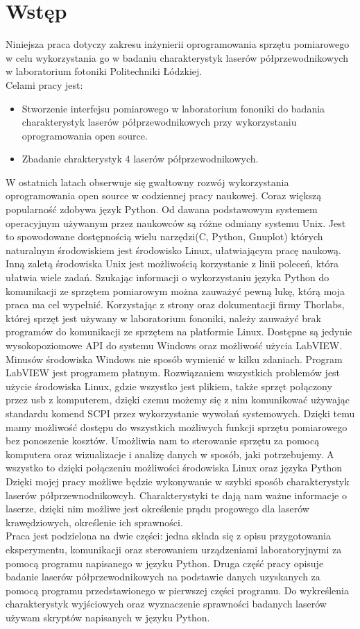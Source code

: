 \chapter{Wstęp} \label{rozdz.wstep}
Niniejsza praca dotyczy zakresu inżynierii oprogramowania sprzętu pomiarowego w celu wykorzystania go w badaniu charakterystyk
laserów półprzewodnikowych w laboratorium fotoniki Politechniki Łódzkiej. \\
Celami pracy jest:
\begin{itemize}
 \item Stworzenie interfejsu pomiarowego w laboratorium fononiki do badania charakterystyk laserów półprzewodnikowych przy wykorzystaniu oprogramowania
open source.
\item Zbadanie chrakterystyk 4 laserów półprzewodnikowych.
 \end{itemize}
W ostatnich latach obserwuje się gwałtowny rozwój wykorzystania oprogramowania
open source w codziennej pracy naukowej. Coraz większą popularność zdobywa język Python.
Od dawana podstawowym systemem operacyjnym używanym przez naukowców są różne odmiany systemu Unix.
Jest to spowodowane dostępnością wielu narzędzi(C, Python,
Gnuplot) których naturalnym środowiskiem jest środowisko Linux, ułatwiającym pracę naukową. Inną
zaletą środowiska Unix jest możliwością korzystanie z linii poleceń, która ułatwia wiele
zadań. Szukając informacji o wykorzystaniu języka Python do komunikacji ze sprzętem pomiarowym można zauważyć pewną lukę,
którą moja praca ma cel wypełnić. Korzystając
z strony oraz dokumentacji firmy Thorlabs, której sprzęt jest używany w laboratorium
fononiki, należy zauważyć brak programów do komunikacji ze sprzętem na platformie Linux.
Dostępne są jedynie wysokopoziomowe API do systemu Windows oraz możliwość użycia
LabVIEW. Minusów środowiska Windows nie sposób wymienić w kilku zdaniach. Program
LabVIEW jest programem płatnym. Rozwiązaniem wszystkich problemów jest użycie środowiska Linux,
gdzie wszystko jest plikiem, także sprzęt połączony przez usb z komputerem, dzięki czemu możemy się z nim komunikować
używając standardu komend SCPI przez
wykorzystanie wywołań systemowych. Dzięki temu mamy możliwość dostępu do wszystkich możliwych funkcji sprzętu
pomiarowego bez ponoszenie kosztów. Umożliwia nam to sterowanie sprzętu za pomocą komputera oraz wizualizacje i analizę danych w sposób, jaki
potrzebujemy. A wszystko to dzięki połączeniu możliwości środowiska Linux oraz języka Python \\
Dzięki mojej pracy możliwe będzie wykonywanie w szybki sposób charakterystyk laserów półprzewnodnikowcyh.
Charakterystyki te dają nam ważne informacje o laserze, dzięki nim możliwe jest określenie prądu progowego dla laserów krawędziowych,
określenie ich sprawności. \\
Praca jest podzielona na dwie części: jedna składa się z opisu przygotowania eksperymentu, komunikacji oraz sterowaniem urządzeniami laboratoryjnymi
 za pomocą programu napisanego w języku Python. Druga część pracy opisuje badanie laserów półprzewodnikowych na podstawie danych uzyskanych
 za pomocą programu przedstawionego w pierwszej części programu. Do wykreślenia charakterystyk wyjściowych oraz wyznaczenie sprawności
 badanych laserów używam skryptów napisanych w języku Python.